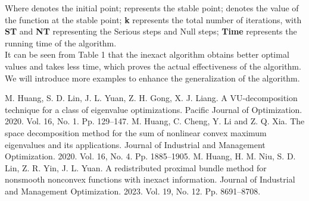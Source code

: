\documentclass[12pt]{llncs}
\begin{document}
Where  denotes the initial point;  represents the stable point;  denotes the value of the function at the stable point; \textbf{k} represents the total number of iterations, with \textbf{ST} and \textbf{NT} representing the Serious steps and Null steps; \textbf{Time} represents the running time of the algorithm.\\
\indent It can be seen from Table 1 that the inexact algorithm obtains better optimal values and takes less time, which proves the actual effectiveness of the algorithm. We will introduce more examples to enhance the generalization of the algorithm.
\begin{thebibliography}{9} %
 M. Huang, S. D. Lin, J. L. Yuan, Z. H. Gong, X. J. Liang. A VU-decomposition technique for a class of eigenvalue optimizations. Pacific Journal of Optimization. 2020. Vol. 16, No. 1. Pp. 129--147.
 M. Huang, C. Cheng, Y. Li and Z. Q. Xia. The space decomposition method for the sum of nonlinear convex maximum eigenvalues and its applications. Journal of Industrial and Management Optimization. 2020. Vol. 16, No. 4. Pp. 1885--1905.
  M. Huang, H. M. Niu, S. D. Lin, Z. R. Yin, J. L. Yuan.
A redistributed proximal bundle method for nonsmooth nonconvex functions with inexact information.
Journal of Industrial and Management Optimization. 2023. Vol. 19, No. 12. Pp. 8691--8708.
\end{thebibliography}

\end{document}

